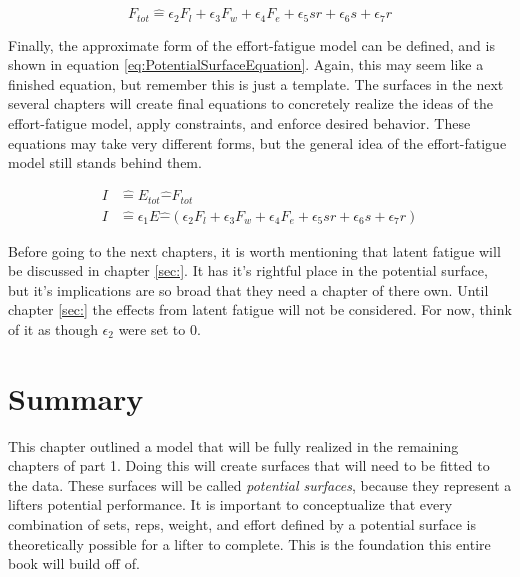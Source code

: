 \begin{equation*}
	F_{tot} \hat{=} \epsilon_2 F_l+\epsilon_3 F_w+\epsilon_4 F_e+\epsilon_5 sr+\epsilon_6 s+\epsilon_7 r
\end{equation*}

Finally, the approximate form of the effort-fatigue model can be defined, and is shown in equation \ref{eq:PotentialSurfaceEquation}. Again, this may seem like a finished equation, but remember this is just a template. The surfaces in the next several chapters will create final equations to concretely realize the ideas of the effort-fatigue model, apply constraints, and enforce desired behavior. These equations may take very different forms, but the general idea of the effort-fatigue model still stands behind them.

\begin{equation}
	\label{eq:PotentialSurfaceEquation}
	\begin{split}
		I & \hat{=} E_{tot}\hat{-}F_{tot} \\
		I & \hat{=} \epsilon_1 E\hat{-}\left( 
			\epsilon_2 F_l+\epsilon_3 F_w+\epsilon_4 F_e+\epsilon_5 sr+\epsilon_6 s+\epsilon_7 r
		\right)
	\end{split}
\end{equation}

Before going to the next chapters, it is worth mentioning that latent fatigue will be discussed in chapter \ref{sec:}. It has it's rightful place in the potential surface, but it's implications are so broad that they need a chapter of there own. Until chapter \ref{sec:} the effects from latent fatigue will not be considered. For now, think of it as though $\epsilon_2$ were set to $0$. 


\section{Summary}

This chapter outlined a model that will be fully realized in the remaining chapters of part 1. Doing this will create surfaces that will need to be fitted to the data. These surfaces will be called \textit{potential surfaces}, because they represent a lifters potential performance. It is important to conceptualize that every combination of sets, reps, weight, and effort defined by a potential surface is theoretically possible for a lifter to complete. This is the foundation this entire book will build off of.






